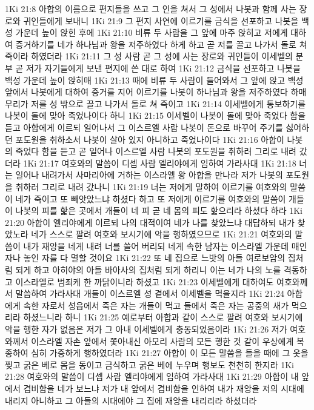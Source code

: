 1Ki 21:8  아합의 이름으로 편지들을 쓰고 그 인을 쳐서 그 성에서 나봇과 함께 사는 장로와 귀인들에게 보내니
1Ki 21:9  그 편지 사연에 이르기를 금식을 선포하고 나봇을 백성 가운데 높이 앉힌 후에
1Ki 21:10  비류 두 사람을 그 앞에 마주 앉히고 저에게 대하여 증거하기를 네가 하나님과 왕을 저주하였다 하게 하고 곧 저를 끌고 나가서 돌로 쳐 죽이라 하였더라
1Ki 21:11  그 성 사람 곧 그 성에 사는 장로와 귀인들이 이세벨의 분부 곧 저가 자기들에게 보낸 편지에 쓴 대로 하여
1Ki 21:12  금식을 선포하고 나봇을 백성 가운데 높이 앉히매
1Ki 21:13  때에 비류 두 사람이 들어와서 그 앞에 앉고 백성앞에서 나봇에게 대하여 증거를 지어 이르기를 나봇이 하나님과 왕을 저주하였다 하매 무리가 저를 성 밖으로 끌고 나가서 돌로 쳐 죽이고
1Ki 21:14  이세벨에게 통보하기를 나봇이 돌에 맞아 죽었나이다 하니
1Ki 21:15  이세벨이 나봇이 돌에 맞아 죽었다 함을 듣고 아합에게 이르되 일어나서 그 이스르엘 사람 나봇이 돈으로 바꾸어 주기를 싫어하던 포도원을 취하소서 나봇이 살아 있지 아니하고 죽었나이다
1Ki 21:16  아합이 나봇의 죽었다 함을 듣고 곧 일어나 이스르엘 사람 나봇의 포도원을 취하러 그리로 내려 갔더라
1Ki 21:17  여호와의 말씀이 디셉 사람 엘리야에게 임하여 가라사대
1Ki 21:18  너는 일어나 내려가서 사마리아에 거하는 이스라엘 왕 아합을 만나라 저가 나봇의 포도원을 취하러 그리로 내려 갔나니
1Ki 21:19  너는 저에게 말하여 이르기를 여호와의 말씀이 네가 죽이고 또 빼앗았느냐 하셨다 하고 또 저에게 이르기를 여호와의 말씀이 개들이 나봇의 피를 핥은 곳에서 개들이 네 피 곧 네 몸의 피도 핥으리라 하셨다 하라
1Ki 21:20  아합이 엘리야에게 이르되 나의 대적이여 네가 나를 찾았느냐 대답하되 내가 찾았노라 네가 스스로 팔려 여호와 보시기에 악을 행하였으므로
1Ki 21:21  여호와의 말씀이 내가 재앙을 네게 내려 너를 쓸어 버리되 네게 속한 남자는 이스라엘 가운데 매인 자나 놓인 자를 다 멸할 것이요
1Ki 21:22  또 네 집으로 느밧의 아들 여로보암의 집처럼 되게 하고 아히야의 아들 바아사의 집처럼 되게 하리니 이는 네가 나의 노를 격동하고 이스라엘로 범죄케 한 까닭이니라 하셨고
1Ki 21:23  이세벨에게 대하여도 여호와께서 말씀하여 가라사대 개들이 이스르엘 성 곁에서 이세벨을 먹을지라
1Ki 21:24  아합에게 속한 자로서 성읍에서 죽은 자는 개들이 먹고 들에서 죽은 자는 공중의 새가 먹으리라 하셨느니라 하니
1Ki 21:25  예로부터 아합과 같이 스스로 팔려 여호와 보시기에 악을 행한 자가 없음은 저가 그 아내 이세벨에게 충동되었음이라
1Ki 21:26  저가 여호와께서 이스라엘 자손 앞에서 쫓아내신 아모리 사람의 모든 행한 것 같이 우상에게 복종하여 심히 가증하게 행하였더라
1Ki 21:27  아합이 이 모든 말씀을 들을 때에 그 옷을 찢고 굵은 베로 몸을 동이고 금식하고 굵은 베에 누우며 행보도 천천히 한지라
1Ki 21:28  여호와의 말씀이 디셉 사람 엘리야에게 임하여 가라사대
1Ki 21:29  아합이 내 앞에서 겸비함을 네가 보느냐 저가 내 앞에서 겸비함을 인하여 내가 재앙을 저의 시대에 내리지 아니하고 그 아들의 시대에야 그 집에 재앙을 내리리라 하셨더라
